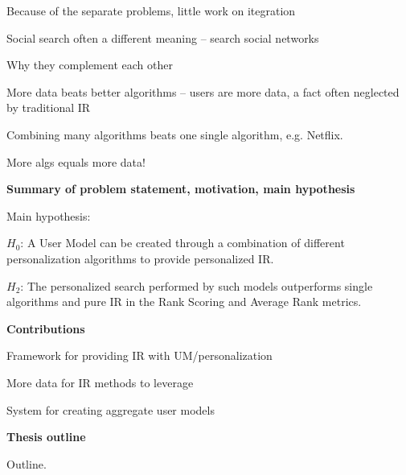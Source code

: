 \begin{itemize*}
  \item Because of the separate problems, little work on itegration
  \item Social search often a different meaning -- search social networks
  \item Why they complement each other
  \item More data beats better algorithms -- users are more data, 
        a fact often neglected by traditional IR
  \item Combining many algorithms beats one single algorithm, e.g. Netflix.
  \item More algs equals more data!
\end{itemize*}

\textbf{Summary of problem statement, motivation, main hypothesis}

Main hypothesis:

\begin{itemize*}
  \item $H_0$: A User Model can be created through a combination of different personalization algorithms to provide personalized IR.
  \item $H_2$: The personalized search performed by such models outperforms single algorithms and pure IR in the Rank Scoring and Average Rank metrics.
\end{itemize*}

\textbf{Contributions}

\begin{itemize*}
  \item Framework for providing IR with UM/personalization
  \item More data for IR methods to leverage
  \item System for creating aggregate user models
\end{itemize*}

\textbf{Thesis outline}

Outline.


